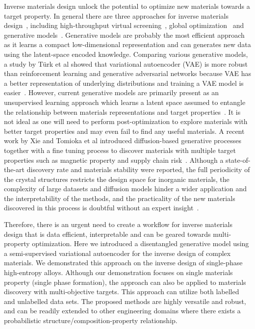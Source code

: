 \documentclass[a4paper]{article}
\begin{document}
Inverse materials design unlock the potential to optimize new materials towards a target property.
In general there are three approaches for inverse materials design~\cite{wang2022}, including high-throughput virtual screening~\cite{afzal2019}, global optimization~\cite{geng2019} and generative models~\cite{ma2019, popova2018}.
Generative models are probably the most efficient approach as it learns a compact low-dimensional representation and can generates new data using the latent-space encoded knowledge.
Comparing various generative models, a study by T\"{u}rk et al showed that variational autoencoder (VAE) is more robust than reinforcement learning and generative adversarial networks because VAE has a better representation of underlying distributions and training a VAE model is easier~\cite{turk2022}.
However, current generative models are primarily present as an unsupervised learning approach which learns a latent space assumed to entangle the relationship between materials representations and target properties~\cite{chen2020, wang2022}.
It is not ideal as one will need to perform post-optimization to explore materials with better target properties and may even fail to find any useful materials.
A recent work by Xie and Tomioka et al introduced diffusion-based generative processes together with a fine tuning process to discover materials with multiple target properties such as magnetic property and supply chain risk~\cite{zeni2024}.
Although a state-of-the-art discovery rate and materials stability were reported, the full periodicity of the crystal structures restricts the design space for inorganic materials, the complexity of large datasets and diffusion models hinder a wider application and the interpretability of the methods, and the practicality of the new materials discovered in this process is doubtful without an expert insight~\cite{cheetham2024}.

Therefore, there is an urgent need to create a workflow for inverse materials design that is data efficient, interpretable and can be geared towards multi-property optimization.
Here we introduced a disentangled generative model using a semi-supervised variational autoencoder for the inverse design of complex materials.
We demonstrated this approach on the inverse design of single-phase high-entropy alloys.
Although our demonstration focuses on single materials property (single phase formation), the approach can also be applied to materials discovery with multi-objective targets.
This approach can utilize both labelled and unlabelled data sets. The proposed methods are highly versatile and robust, and can be readily extended to other engineering domains where there exists a probabilistic structure/composition-property relationship.
\end{document}
